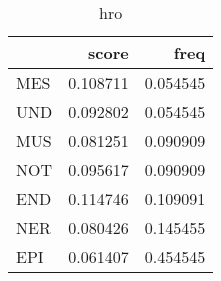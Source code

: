 \begin{table}[H]
\begin{center}
\begin{tabular}{lrr}
\toprule
 & score & freq \\
\midrule
MES & {\cellcolor[HTML]{F5FBB8}} \color[HTML]{000000} 0.108711 & {\cellcolor[HTML]{FFFFE5}} \color[HTML]{000000} 0.054545 \\
UND & {\cellcolor[HTML]{F9FDC4}} \color[HTML]{000000} 0.092802 & {\cellcolor[HTML]{FFFFE5}} \color[HTML]{000000} 0.054545 \\
MUS & {\cellcolor[HTML]{FBFDCE}} \color[HTML]{000000} 0.081251 & {\cellcolor[HTML]{F9FDC5}} \color[HTML]{000000} 0.090909 \\
NOT & {\cellcolor[HTML]{F8FDC1}} \color[HTML]{000000} 0.095617 & {\cellcolor[HTML]{F9FDC5}} \color[HTML]{000000} 0.090909 \\
END & {\cellcolor[HTML]{F1FAB5}} \color[HTML]{000000} 0.114746 & {\cellcolor[HTML]{F5FBB8}} \color[HTML]{000000} 0.109091 \\
NER & {\cellcolor[HTML]{FBFDCF}} \color[HTML]{000000} 0.080426 & {\cellcolor[HTML]{DEF2A7}} \color[HTML]{000000} 0.145455 \\
EPI & {\cellcolor[HTML]{FEFFDF}} \color[HTML]{000000} 0.061407 & {\cellcolor[HTML]{004529}} \color[HTML]{F1F1F1} 0.454545 \\
\bottomrule
\end{tabular}
\caption{hro}\end{center}\end{table}